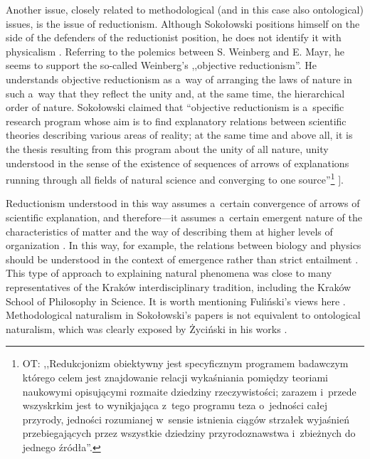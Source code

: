 \documentclass[%
  manuscript=article,
  year=2024,
  volume=77,
  doi=00000.000,
]{zfn}
\begin{document}
Another issue, closely related to methodological (and in this case also ontological) issues, is the issue of reductionism. Although Sokołowski positions himself on the side of the defenders of the reductionist position, he does not identify it with physicalism 
\parencite[][]{}. %
 Referring to the polemics between S. Weinberg and E. Mayr, he seems to support the so-called Weinberg's ,,objective reductionism''. He understands objective reductionism as a~way of arranging the laws of nature in such a~way that they reflect the unity and, at the same time, the hierarchical order of nature. Sokołowski claimed that ``objective reductionism is a~specific research program whose aim is to find explanatory relations between scientific theories describing various areas of reality; at the same time and above all, it is the thesis resulting from this program about the unity of all nature, unity understood in the sense of the existence of sequences of arrows of explanations running through all fields of natural science and converging to one source''\footnote{OT: ,,Redukcjonizm obiektywny jest specyficznym programem badawczym którego celem jest znajdowanie relacji wykaśniania pomiędzy teoriami naukowymi opisującymi rozmaite dziedziny rzeczywistości; zarazem i~przede wszyskrkim jest to wynikjająca z~tego programu teza o~jedności całej przyrody, jedności rozumianej w~sensie istnienia ciągów strzałek wyjaśnień przebiegających przez wszystkie dziedziny przyrodoznawstwa i~zbieżnych do jednego źródła''.} 
\parencite[][p.75]{}%
].



Reductionism understood in this way assumes a~certain convergence of arrows of scientific explanation, and therefore---it assumes a~certain emergent nature of the characteristics of matter and the way of describing them at higher levels of organization 
\parencite[see][]{}. %
 In this way, for example, the relations between biology and physics should be understood in the context of emergence rather than strict entailment 
\parencite[][p.216]{}. %
 This type of approach to explaining natural phenomena was close to many representatives of the Kraków interdisciplinary tradition, including the Kraków School of Philosophy in Science. It is worth mentioning Fuliński's views here 
\parencite[e.g.,][]{}. %
 Methodological naturalism in Sokołowski's papers is not equivalent to ontological naturalism, which was clearly exposed by Życiński in his works 
\parencite[][]{}.%
\end{document}
